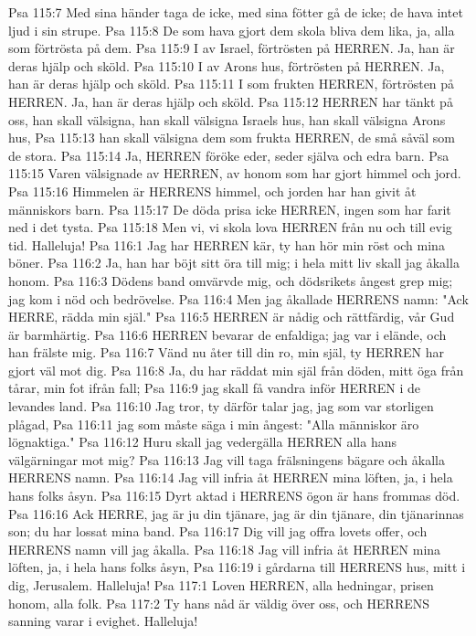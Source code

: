 Psa 115:7  Med sina händer taga de icke, med sina fötter gå de icke; de hava intet ljud i sin strupe.
Psa 115:8  De som hava gjort dem skola bliva dem lika, ja, alla som förtrösta på dem.
Psa 115:9  I av Israel, förtrösten på HERREN. Ja, han är deras hjälp och sköld.
Psa 115:10  I av Arons hus, förtrösten på HERREN. Ja, han är deras hjälp och sköld.
Psa 115:11  I som frukten HERREN, förtrösten på HERREN. Ja, han är deras hjälp och sköld.
Psa 115:12  HERREN har tänkt på oss, han skall välsigna, han skall välsigna Israels hus, han skall välsigna Arons hus,
Psa 115:13  han skall välsigna dem som frukta HERREN, de små såväl som de stora.
Psa 115:14  Ja, HERREN föröke eder, seder själva och edra barn.
Psa 115:15  Varen välsignade av HERREN, av honom som har gjort himmel och jord.
Psa 115:16  Himmelen är HERRENS himmel, och jorden har han givit åt människors barn.
Psa 115:17  De döda prisa icke HERREN, ingen som har farit ned i det tysta.
Psa 115:18  Men vi, vi skola lova HERREN från nu och till evig tid. Halleluja!
Psa 116:1  Jag har HERREN kär, ty han hör min röst och mina böner.
Psa 116:2  Ja, han har böjt sitt öra till mig; i hela mitt liv skall jag åkalla honom.
Psa 116:3  Dödens band omvärvde mig, och dödsrikets ångest grep mig; jag kom i nöd och bedrövelse.
Psa 116:4  Men jag åkallade HERRENS namn: "Ack HERRE, rädda min själ."
Psa 116:5  HERREN är nådig och rättfärdig, vår Gud är barmhärtig.
Psa 116:6  HERREN bevarar de enfaldiga; jag var i elände, och han frälste mig.
Psa 116:7  Vänd nu åter till din ro, min själ, ty HERREN har gjort väl mot dig.
Psa 116:8  Ja, du har räddat min själ från döden, mitt öga från tårar, min fot ifrån fall;
Psa 116:9  jag skall få vandra inför HERREN i de levandes land.
Psa 116:10  Jag tror, ty därför talar jag, jag som var storligen plågad,
Psa 116:11  jag som måste säga i min ångest: "Alla människor äro lögnaktiga."
Psa 116:12  Huru skall jag vedergälla HERREN alla hans välgärningar mot mig?
Psa 116:13  Jag vill taga frälsningens bägare och åkalla HERRENS namn.
Psa 116:14  Jag vill infria åt HERREN mina löften, ja, i hela hans folks åsyn.
Psa 116:15  Dyrt aktad i HERRENS ögon är hans frommas död.
Psa 116:16  Ack HERRE, jag är ju din tjänare, jag är din tjänare, din tjänarinnas son; du har lossat mina band.
Psa 116:17  Dig vill jag offra lovets offer, och HERRENS namn vill jag åkalla.
Psa 116:18  Jag vill infria åt HERREN mina löften, ja, i hela hans folks åsyn,
Psa 116:19  i gårdarna till HERRENS hus, mitt i dig, Jerusalem. Halleluja!
Psa 117:1  Loven HERREN, alla hedningar, prisen honom, alla folk.
Psa 117:2  Ty hans nåd är väldig över oss, och HERRENS sanning varar i evighet. Halleluja!
